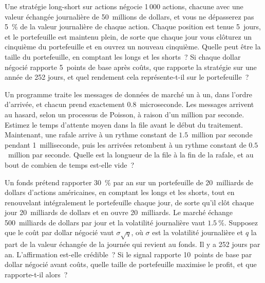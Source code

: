\begin{question}\label{iq:iv1:estimation:23}
Une stratégie long-short sur actions négocie 1\,000 actions, chacune avec une valeur échangée journalière de 50~millions de dollars, et vous ne dépasserez pas 5~\% de la valeur journalière de chaque action. Chaque position est tenue 5~jours, et le portefeuille est maintenu plein, de sorte que chaque jour vous clôturez un cinquième du portefeuille et en ouvrez un nouveau cinquième. Quelle peut être la taille du portefeuille, en comptant les longs et les shorts~? Si chaque dollar négocié rapporte 5~points de base après coûts, que rapporte la stratégie sur une année de 252 jours, et quel rendement cela représente-t-il sur le portefeuille~?
\end{question}

\begin{question}\label{iq:iv1:estimation:24}
Un programme traite les messages de données de marché un à un, dans l'ordre d'arrivée, et chacun prend exactement $0.8$~microseconde. Les messages arrivent au hasard, selon un processus de Poisson, à raison d'un million par seconde. Estimez le temps d'attente moyen dans la file avant le début du traitement. Maintenant, une rafale arrive à un rythme constant de $1.5$~million par seconde pendant 1~milliseconde, puis les arrivées retombent à un rythme constant de $0.5$~million par seconde. Quelle est la longueur de la file à la fin de la rafale, et au bout de combien de temps est-elle vide~?
\end{question}

\begin{question}\label{iq:iv1:estimation:25}
Un fonds prétend rapporter 30~\% par an sur un portefeuille de 20~milliards de dollars d'actions américaines, en comptant les longs et les shorts, tout en renouvelant intégralement le portefeuille chaque jour, de sorte qu'il clôt chaque jour 20~milliards de dollars et en ouvre 20~milliards. Le marché échange 500~milliards de dollars par jour et la volatilité journalière vaut $1.5~\%$. Supposez que le coût par dollar négocié vaut $\sigma\sqrt{q}$, où $\sigma$ est la volatilité journalière et $q$ la part de la valeur échangée de la journée qui revient au fonds. Il y a 252 jours par an. L'affirmation est-elle crédible~? Si le signal rapporte 10~points de base par dollar négocié avant coûts, quelle taille de portefeuille maximise le profit, et que rapporte-t-il alors~?
\end{question}
